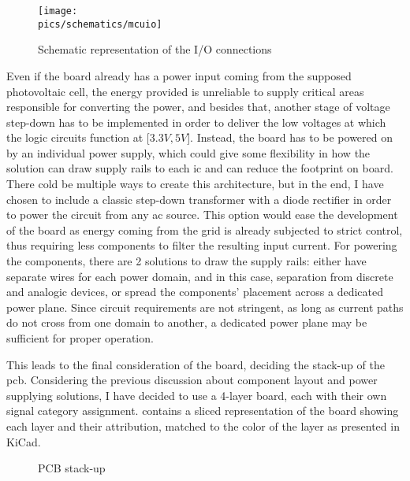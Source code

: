 \begin{figure}[!ht]
    \begin{center}\texttt{[image: \\pics/schematics/mcuio]}\end{center}
    \caption{Schematic representation of the I/O connections}
    \label{fig:mcuio}
\end{figure}

Even if the board already has a power input coming from the supposed photovoltaic cell, the energy provided is unreliable to supply critical areas responsible for converting the power, and besides that, another stage of voltage step-down has to be implemented in order to deliver the low voltages at which the logic circuits function at [$3.3V, 5V$].
Instead, the board has to be powered on by an individual power supply, which could give some flexibility in how the solution can draw supply rails to each \gls{ic} and can reduce the footprint on board.
There cold be multiple ways to create this architecture, but in the end, I have chosen to include a classic step-down transformer with a diode rectifier in order to power the circuit from any \gls{ac} source.
This option would ease the development of the board as energy coming from the grid is already subjected to strict control, thus requiring less components to filter the resulting input current.
For powering the components, there are 2 solutions to draw the supply rails: either have separate wires for each power domain, and in this case, separation from discrete and analogic devices, or spread the components' placement across a dedicated power plane\cite{zumbahlen2007basic}. 
Since circuit requirements are not stringent, as long as current paths do not cross from one domain to another, a dedicated power plane may be sufficient for proper operation.

This leads to the final consideration of the board, deciding the stack-up of the \gls{pcb}.
Considering the previous discussion about component layout and power supplying solutions, I have decided to use a 4-layer board, each with their own signal category assignment.
 contains a sliced representation of the board showing each layer and their attribution, matched to the color of the layer as presented in KiCad.

\begin{figure}[!ht]
    \begin{center}
        \caption{PCB stack-up}
        \label{fig:stack}
    \end{center}
\end{figure}

